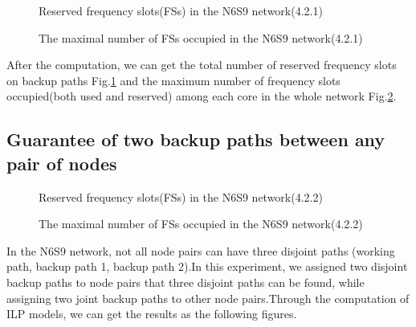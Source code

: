\documentclass[a4paper,11pt]{report}
\begin{document}
    \begin{figure}[htbp]
    \begin{center}
    \end{center}
    \caption{Reserved frequency slots(FSs) in the N6S9 network(4.2.1)}
    \label{figure:N6_without_FS}
    \end{figure}
    
    \begin{figure}[htbp]
    \begin{center}
    \end{center}
    \caption{The maximal number of FSs occupied in the N6S9 network(4.2.1)}
    \label{figure:N6_without_Cmax}
    \end{figure}
    After the computation, we can get the total number of reserved frequency slots on backup paths Fig.\ref{figure:N6_without_FS} and the maximum number of frequency slots occupied(both used and reserved) among each core in the whole network Fig.\ref{figure:N6_without_Cmax}. 
      
    

\subsection{Guarantee of two backup paths between any pair of nodes}
    
    \begin{figure}[htbp]
    \begin{center}
    \end{center}
    \caption{Reserved frequency slots(FSs) in the N6S9 network(4.2.2)}
    \label{figure:N6_with_FS}
    \end{figure}
   
    \begin{figure}[htbp]
    \begin{center}
    \end{center}
    \caption{The maximal number of FSs occupied in the N6S9 network(4.2.2)}
    \label{figure:N6_with_Cmax}
    \end{figure}
    In the N6S9 network, not all node pairs can have three disjoint paths (working path, backup path 1, backup path 2).In this experiment, we assigned two disjoint backup paths to node pairs that three disjoint paths can be found, while assigning two joint backup paths to other node pairs.Through the computation of ILP models, we can get the results as the following figures.
\end{document}
